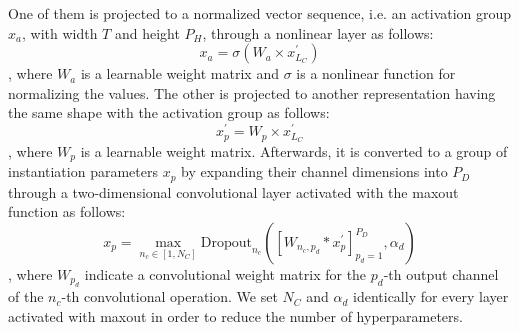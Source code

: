\documentclass[review]{elsarticle}
\begin{document}
One of them is projected to a normalized vector sequence, i.e. an activation group $x_a$, with width $T$ and height $P_H$, through a nonlinear layer as follows:
\begin{equation}
x_a=\sigma(W_{a} \times x^\prime_{L_C})
\label{eq:nonlinear}
\end{equation}
, where $W_a$ is a learnable weight matrix and $\sigma$ is a nonlinear function for normalizing the values.
The other is projected to another representation having the same shape with the activation group as follows:
\begin{equation}
x_p^\prime=W_{p} \times x^\prime_{L_C}
\label{eq:linear}
\end{equation}
, where $W_p$ is a learnable weight matrix.
Afterwards, it is converted to a group of instantiation parameters $x_p$ by expanding their channel dimensions into $P_D$ through a two-dimensional convolutional layer activated with the maxout function as follows:
\begin{equation}
x_p=\max_{n_c\in[1, N_C]}\text{Dropout}_{n_c}([W_{n_c, p_d} * x_p^\prime]_{p_d=1}^{P_D}, \alpha_d)
\label{eq:maxout2}
\end{equation}
, where $W_{p_d}$ indicate a convolutional weight matrix for the $p_d$-th output channel of the $n_c$-th convolutional operation.
We set $N_C$ and $\alpha_d$ identically for every layer activated with maxout in order to reduce the number of hyperparameters.
\end{document}
